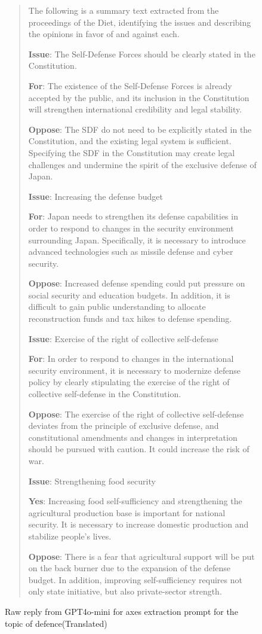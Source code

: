 \documentclass[final,5p,times,twocolumn,authoryear]{elsarticle}
\begin{document}
\begin{figure}[htbp]
    \centering
    \begin{quote}
The following is a summary text extracted from the proceedings of the Diet, identifying the issues and describing the opinions in favor of and against each.

\textbf{Issue}: The Self-Defense Forces should be clearly stated in the Constitution.

\textbf{For}: The existence of the Self-Defense Forces is already accepted by the public, and its inclusion in the Constitution will strengthen international credibility and legal stability.

\textbf{Oppose}: The SDF do not need to be explicitly stated in the Constitution, and the existing legal system is sufficient.
Specifying the SDF in the Constitution may create legal challenges and undermine the spirit of the exclusive defense of Japan.

\textbf{Issue}: Increasing the defense budget

\textbf{For}: Japan needs to strengthen its defense capabilities in order to respond to changes in the security environment surrounding Japan. Specifically, it is necessary to introduce advanced technologies such as missile defense and cyber security.

\textbf{Oppose}: Increased defense spending could put pressure on social security and education budgets. In addition, it is difficult to gain public understanding to allocate reconstruction funds and tax hikes to defense spending.

\textbf{Issue}: Exercise of the right of collective self-defense

\textbf{For}: In order to respond to changes in the international security environment, it is necessary to modernize defense policy by clearly stipulating the exercise of the right of collective self-defense in the Constitution.

\textbf{Oppose}: The exercise of the right of collective self-defense deviates from the principle of exclusive defense, and constitutional amendments and changes in interpretation should be pursued with caution. It could increase the risk of war.

\textbf{Issue}: Strengthening food security

\textbf{Yes}: Increasing food self-sufficiency and strengthening the agricultural production base is important for national security. It is necessary to increase domestic production and stabilize people's lives.

\textbf{Oppose}: There is a fear that agricultural support will be put on the back burner due to the expansion of the defense budget. In addition, improving self-sufficiency requires not only state initiative, but also private-sector strength.
       
    \end{quote}
    \caption{Raw reply from GPT4o-mini for axes extraction prompt for the topic of defence(Translated)}
    \label{fig: raw axes extraction}
\end{figure}
\end{document}
